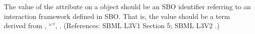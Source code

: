 The value of the attribute  on a \Model object should be an
SBO identifier referring to an interaction  framework defined in SBO.  That
is, the value should be a term derived from \sbointeractionID,
``'', .  (References: SBML L3V1 Section 5; SBML L3V2 .)
